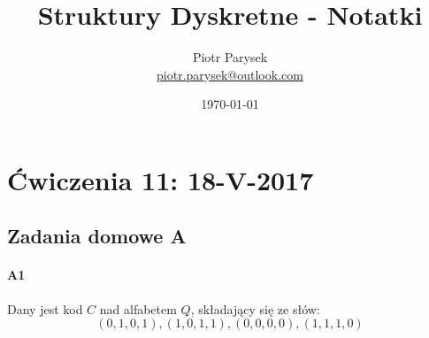 \documentclass[a4paper,12pt]{article}
\title{Struktury Dyskretne - Notatki}
\author{Piotr Parysek\\
\href{mailto:piotr.parysek@outlook.com}{piotr.parysek@outlook.com} }
\date{\today}
\theoremstyle{definition}%
\theoremstyle{definition}
\theoremstyle{problem}
\begin{document}
\maketitle

\tableofcontents
\section{Ćwiczenia 11: 18-V-2017}
\subsection{Zadania domowe A}
\paragraph{A1} Dany jest kod $C$ nad alfabetem $Q$, składający się ze słów:
$$(0, 1, 0, 1), (1, 0, 1, 1), (0, 0, 0, 0), (1, 1, 1, 0)$$
\end{document}
